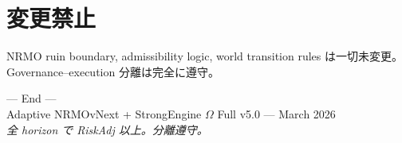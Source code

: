 \documentclass[11pt,a4paper]{article}
\begin{document}
\section{変更禁止}

NRMO ruin boundary, admissibility logic, world transition rules は一切未変更。
Governance--execution 分離は完全に遵守。

\vfill\begin{center}\small\sffamily\color{ngr}
--- End ---\\
Adaptive NRMOvNext + StrongEngine $\Omega$ Full v5.0 — March 2026\\
\textit{全 horizon で RiskAdj 以上。分離遵守。}
\end{center}
\end{document}
